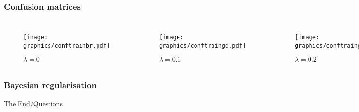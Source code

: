 \documentclass[10pt]{beamer}
\begin{document}
\begin{frame} \frametitle{Confusion matrices}

  \begin{columns}[c]
  \begin{figure}[htbp]
    \centering
      \texttt{[image: graphics/conftrainbr.pdf]}
    \caption{$\lambda = 0$}
    \label{fig:graphics_conf0.0}
  \end{figure}
  
  \begin{figure}[htbp]
    \centering
      \texttt{[image: graphics/conftraingd.pdf]}
    \caption{$\lambda = 0.1$}
    \label{fig:graphics_conf0.1}
  \end{figure}  
  
  
  \begin{figure}[htbp]
    \centering
      \texttt{[image: graphics/conftraingda.pdf]}
    \caption{$\lambda = 0.2$}
    \label{fig:graphics_conf0_2}
  \end{figure}
  
  \begin{figure}[htbp]
    \centering
      \texttt{[image: graphics/conftraingdm.pdf]}
    \caption{$\lambda = 0.5$}
    \label{fig:graphics_conf0_5}
  \end{figure}
  
  
  \begin{figure}[htbp]
    \centering
      \texttt{[image: graphics/conftraingdx.pdf]}
    \caption{$\lambda = 1$}
    \label{fig:graphics_conf1_0}
  \end{figure}
  
  \begin{figure}[htbp]
    \centering
      \texttt{[image: graphics/conftrainrp.pdf]}
    \caption{$\lambda = 1$}
    \label{fig:graphics_conf1_0}
  \end{figure}

  \end{columns}


\end{frame}

\begin{frame} \frametitle{Bayesian regularisation}

\end{frame}


\begin{frame}
\Huge{\centerline{The End/Questions}}
\end{frame}

\end{document}
